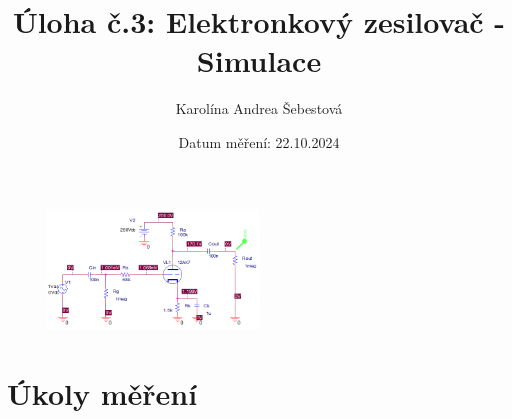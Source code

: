 \documentclass[a4paper, czech]{article}
\title{Úloha č.3: Elektronkový zesilovač - Simulace}
\author{Karolína Andrea Šebestová}
\date{Datum měření: 22.10.2024}
\begin{document}
\maketitle

\begin{figure}[H]
    \centering
    \includegraphics[width=0.5\textwidth]{schema.png}
\end{figure}

\section{Úkoly měření}
\end{document}
